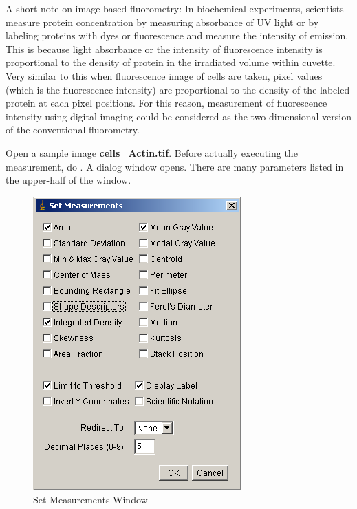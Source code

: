 A short note on image-based fluorometry: In biochemical experiments,
scientists measure protein concentration by measuring absorbance of UV
light or by labeling proteins with dyes or fluorescence and measure the
intensity of emission. This is because light absorbance or the
intensity of fluorescence intensity is proportional to the density of
protein in the irradiated volume within cuvette. Very similar to this
when fluorescence image of cells are taken, pixel values (which is the
fluorescence intensity) are proportional to the density of the labeled
protein at each pixel positions. For this reason, measurement of
fluorescence intensity using digital imaging could be considered as the
two dimensional version of the conventional fluorometry. 

\begin{indentexercise}{1}
\item Open a sample image \textbf{cells\_Actin.tif}. Before actually executing the measurement,
do . A dialog
window opens. There are many parameters listed in the upper-half of the
window.

\begin{figure}[htbp]
\begin{center}
\includegraphics[width=8.017cm,height=11.298cm]{fig/CMCIBasicCourse201102-img32.png}
\caption{Set Measurements Window}
\label{fig:img32}
\end{center}
\end{figure}



\end{indentexercise}
